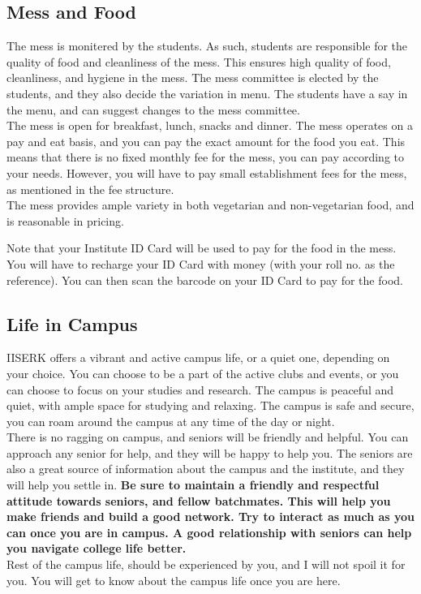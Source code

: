 \documentclass[openany]{book}
\begin{document}
\subsection{Mess and Food}
The mess is monitered by the students. As such, students are responsible for the quality of food and cleanliness of the mess. This ensures high quality of food, cleanliness, and hygiene in the mess. The mess committee is elected by the students, and they also decide the variation in menu. The students have a say in the menu, and can suggest changes to the mess committee. \\
The mess is open for breakfast, lunch, snacks and dinner. The mess operates on a pay and eat basis, and you can pay the exact amount for the food you eat. This means that there is no fixed monthly fee for the mess, you can pay according to your needs. However, you will have to pay small establishment fees for the mess, as mentioned in the fee structure. \\
The mess provides ample variety in both vegetarian and non-vegetarian food, and is reasonable in pricing. 
\begin{mynote}
    Note that your Institute ID Card will be used to pay for the food in the mess. You will have to recharge your ID Card with money (with your roll no. as the reference). You can then scan the barcode on your ID Card to pay for the food.
\end{mynote}
\subsection{Life in Campus}
IISERK offers a vibrant and active campus life, or a quiet one, depending on your choice. You can choose to be a part of the active clubs and events, or you can choose to focus on your studies and research. The campus is peaceful and quiet, with ample space for studying and relaxing. The campus is safe and secure, you can roam around the campus at any time of the day or night. \\
There is no ragging on campus, and seniors will be friendly and helpful. You can approach any senior for help, and they will be happy to help you. The seniors are also a great source of information about the campus and the institute, and they will help you settle in. \textbf{Be sure to maintain a friendly and respectful attitude towards seniors, and fellow batchmates. This will help you make friends and build a good network. Try to interact as much as you can once you are in campus. A good relationship with seniors can help you navigate college life better.} \\
Rest of the campus life, should be experienced by you, and I will not spoil it for you. You will get to know about the campus life once you are here.
\end{document}

